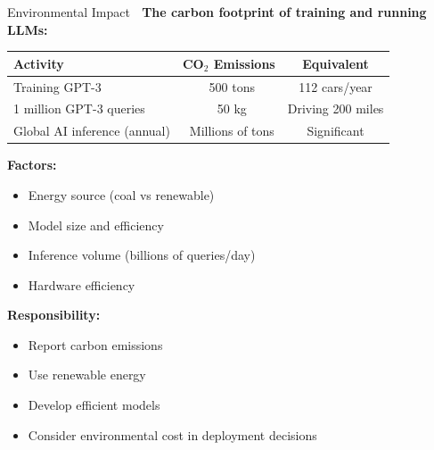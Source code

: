\documentclass[aspectratio=169]{beamer}
\begin{document}
\begin{frame}[shrink=10]{Environmental Impact 🌱}
\textbf{The carbon footprint of training and running LLMs:}

\vspace{0.5em}

\begin{table}
\small
\begin{tabular}{l c c}
\toprule
\textbf{Activity} & \textbf{CO$_2$ Emissions} & \textbf{Equivalent} \\
\midrule
Training GPT-3 & ~500 tons & 112 cars/year \\
1 million GPT-3 queries & ~50 kg & Driving 200 miles \\
Global AI inference (annual) & ~Millions of tons & Significant \\
\bottomrule
\end{tabular}
\end{table}

\vspace{0.5em}

\textbf{Factors:}
\begin{itemize}\setlength{\itemsep}{0pt}
    \item Energy source (coal vs renewable)
    \item Model size and efficiency
    \item Inference volume (billions of queries/day)
    \item Hardware efficiency
\end{itemize}

\vspace{0.5em}

\textbf{Responsibility:}
\begin{itemize}\setlength{\itemsep}{0pt}
    \item Report carbon emissions
    \item Use renewable energy
    \item Develop efficient models
    \item Consider environmental cost in deployment decisions
\end{itemize}
\end{frame}
\end{document}
